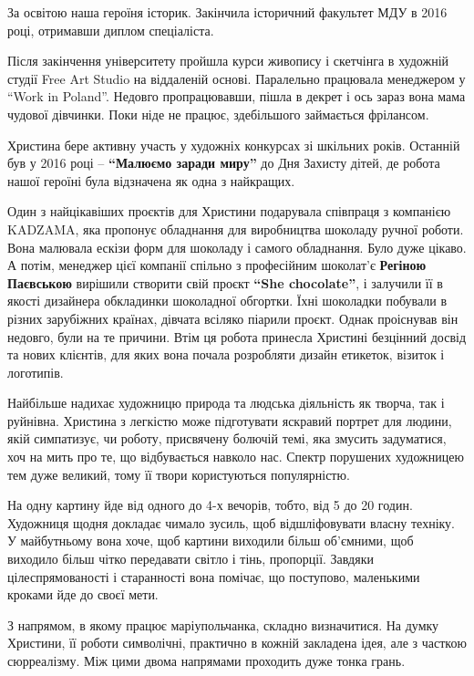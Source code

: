 
За освітою наша героїня історик. Закінчила історичний факультет МДУ в 2016
році, отримавши диплом спеціаліста.

Після закінчення університету пройшла курси живопису і скетчінга в художній
студії Free Art Studio на віддаленій основі. Паралельно працювала менеджером у
\enquote{Work in Poland}. Недовго пропрацювавши, пішла в декрет і ось зараз
вона мама чудової дівчинки. Поки ніде не працює, здебільшого займається
фрілансом.

Христина бере активну участь у художніх конкурсах зі шкільних років. Останній
був у 2016 році – \textbf{\enquote{Малюємо заради миру}} до Дня Захисту дітей,
де робота нашої героїні була відзначена як одна з найкращих.


Один з найцікавіших проєктів для Христини подарувала співпраця з компанією
KADZAMA, яка пропонує обладнання для виробництва шоколаду ручної роботи. Вона
малювала ескізи форм для шоколаду і самого обладнання. Було дуже цікаво. А
потім, менеджер цієї компанії спільно з професійним шоколат'є \textbf{Регіною Паєвською}
вирішили створити свій проєкт \textbf{\enquote{She chocolate}}, і залучили її в якості дизайнера
обкладинки шоколадної обгортки. Їхні шоколадки побували в різних зарубіжних
країнах, дівчата всіляко піарили проєкт. Однак проіснував він недовго, були на
те причини. Втім ця робота принесла Христині безцінний досвід та нових
клієнтів, для яких вона почала розробляти дизайн етикеток, візиток і логотипів.

Найбільше надихає художницю природа та людська діяльність як творча, так і
руйнівна. Христина з легкістю може підготувати яскравий портрет для людини,
якій симпатизує, чи роботу, присвячену болючій темі, яка змусить задуматися,
хоч на мить про те, що відбувається навколо нас. Спектр порушених художницею
тем дуже великий, тому її твори користуються популярністю.

На одну картину йде від одного до 4-х вечорів, тобто, від 5 до 20 годин.
Художниця щодня докладає чимало зусиль, щоб відшліфовувати власну техніку. У
майбутньому вона хоче, щоб картини виходили більш об'ємними, щоб виходило більш
чітко передавати світло і тінь, пропорції. Завдяки цілеспрямованості і
старанності вона помічає, що поступово, маленькими кроками йде до своєї мети.

З напрямом, в якому працює маріупольчанка, складно визначитися. На думку
Христини, її роботи символічні, практично в кожній закладена ідея, але з
часткою сюрреалізму. Між цими двома напрямами проходить дуже тонка грань.

